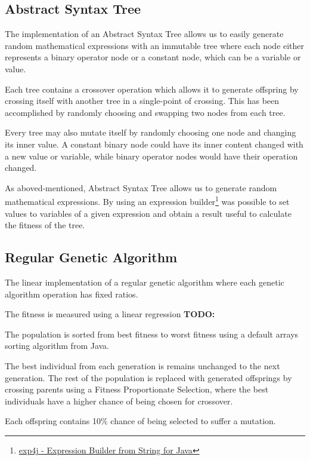 \documentclass[runningheads]{llncs}
\begin{document}
\subsection{Abstract Syntax Tree}
The implementation of an Abstract Syntax Tree allows us to easily generate random mathematical expressions with an immutable tree where each node either represents a binary operator node or a constant node, which can be a variable or value.

Each tree contains a crossover operation which allows it to generate offspring by crossing itself with another tree in a single-point of crossing. This has been accomplished by randomly choosing and swapping two nodes from each tree.

Every tree may also mutate itself by randomly choosing one node and changing its inner value. A constant binary node could have its inner content changed with a new value or variable, while binary operator nodes would have their operation changed.

As aboved-mentioned, Abstract Syntax Tree allows us to generate random mathematical expressions. By using an expression builder\footnote{\href{https://www.objecthunter.net/exp4j/index.htm}{exp4j - Expression Builder from String for Java}} was possible to set values to variables of a given expression and obtain a result useful to calculate the fitness of the tree.

\subsection{Regular Genetic Algorithm}
The linear implementation of a regular genetic algorithm where each genetic algorithm operation has fixed ratios. 

The fitness is measured using a linear regression \textbf{TODO:} %

The population is sorted from best fitness to worst fitness using a default arrays sorting algorithm from Java.

The best individual from each generation is remains unchanged to the next generation. The rest of the population is replaced with generated offsprings by crossing parents using a Fitness Proportionate Selection, where the best individuals have a higher chance of being chosen for crossover.

Each offspring contains 10\% chance of being selected to suffer a mutation.
\end{document}
